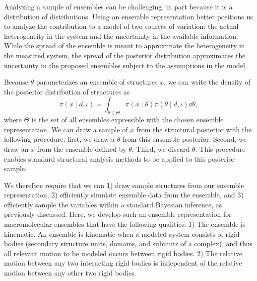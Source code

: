 \documentclass[../../main.tex]{subfiles}
\begin{document}
\begin{refsection}


	Analyzing a sample of ensembles can be challenging, in part because it is a distribution of distributions.
	Using an ensemble representation better positions us to analyze the contribution to a model of two sources of variation: the actual heterogeneity in the system and the uncertainty in the available information.
	While the spread of the ensemble is meant to approximate the heterogeneity in the measured system, the spread of the posterior distribution approximates the uncertainty in the proposed ensembles subject to the assumptions in the model.

	Because $\theta$ parameterizes an ensemble of structures $x$, we can write the density of the posterior distribution of structures as
	$$\pi(x \mid d, \iota) = \int_{\theta \in \Theta} \pi(x \mid \theta) \pi(\theta \mid d, \iota) \dd{\theta},$$
	where $\Theta$ is the set of all ensembles expressible with the chosen ensemble representation.
	We can draw a sample of $x$ from the structural posterior with the following procedure:
	first, we draw a $\theta$ from this ensemble posterior.
	Second, we draw an $x$ from the ensemble defined by $\theta$.
	Third, we discard $\theta$.
	This procedure enables standard structural analysis methods to be applied to this posterior sample.


	We therefore require that we can 1) draw sample structures from our ensemble representation, 2) efficiently simulate ensemble data from the ensemble, and 3) efficiently sample the variables within a standard Bayesian inference, as previously discussed.
	Here, we develop such an ensemble representation for macromolecular ensembles that have the following qualities:
	1) The ensemble is kinematic.
	An ensemble is kinematic when a modeled system consists of rigid bodies (\eg secondary structure units, domains, and subunits of a complex), and thus all relevant motion to be modeled occurs between rigid bodies.
	2) The relative motion between any two interacting rigid bodies is independent of the relative motion between any other two rigid bodies.


\end{refsection}
\end{document}
